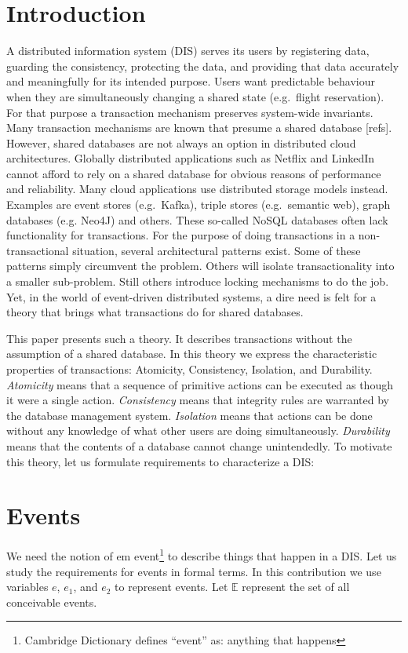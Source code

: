 \documentclass{elsarticle}
\begin{document}
\section{Introduction}
\label{sct:Introduction}
	A distributed information system (DIS) serves its users by registering data, guarding the consistency, protecting the data,
	and providing that data accurately and meaningfully for its intended purpose.
	Users want predictable behaviour when they are simultaneously changing a shared state (e.g.\ flight reservation).
	For that purpose a transaction mechanism preserves system-wide invariants.
	Many transaction mechanisms are known that presume a shared database [refs].
	However, shared databases are not always an option in distributed cloud architectures.
	Globally distributed applications such as Netflix and LinkedIn cannot afford to rely on a shared database for obvious reasons of performance and reliability.
	Many cloud applications use distributed storage models instead.
	Examples are event stores (e.g.\ Kafka), triple stores (e.g.\ semantic web), graph databases (e.g. Neo4J) and others.
	These so-called NoSQL databases often lack functionality for transactions.
	For the purpose of doing transactions in a non-transactional situation, several architectural patterns exist.
	Some of these patterns simply circumvent the problem.
	Others will isolate transactionality into a smaller sub-problem.
	Still others introduce locking mechanisms to do the job.
	Yet, in the world of event-driven distributed systems, a dire need is felt for a theory that brings what transactions do for shared databases.
	
	This paper presents such a theory.
	It describes transactions without the assumption of a shared database.
	In this theory we express the characteristic properties of transactions: Atomicity, Consistency, Isolation, and Durability.
	{\em Atomicity} means that a sequence of primitive actions can be executed as though it were a single action.
	{\em Consistency} means that integrity rules are warranted by the database management system.
	{\em Isolation} means that actions can be done without any knowledge of what other users are doing simultaneously.
	{\em Durability} means that the contents of a database cannot change unintendedly.
	To motivate this theory, let us formulate requirements to characterize a DIS:

\section{Events}
\label{sct:Events}
	We need the notion of {em event}\footnote{Cambridge Dictionary defines ``event'' as: anything that happens} to describe things that happen in a DIS.
	Let us study the requirements for events in formal terms.
	In this contribution we use variables $e$, $e_1$, and $e_2$ to represent events.
	Let $\mathbb E$ represent the set of all conceivable events.
\end{document}

